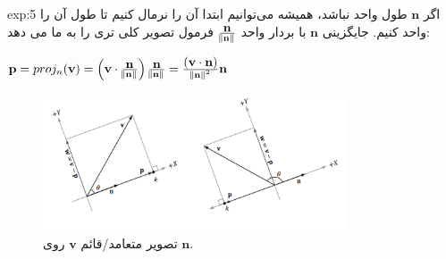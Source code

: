 {\begin{spacing}{1.5}
\begin{example}{exp:5}
            اگر $\textbf{n}$ طول واحد نباشد، همیشه می‌توانیم ابتدا آن را نرمال کنیم تا طول آن را واحد کنیم.
            جایگزینی $\textbf{n}$ با بردار واحد $\frac{\displaystyle\textbf{n}}{\norm{\textbf{n}}}$ فرمول تصویر کلی تری را به ما می دهد:

            \begin{center}
                $\textbf{p}=proj_{n}(\textbf{v})=\left( \textbf{v}\cdot\frac{\displaystyle\textbf{n}}{\norm{\textbf{n}}} \right)\frac{\displaystyle\textbf{n}}{\norm{\textbf{n}}}=\frac{\displaystyle(\textbf{v}\cdot\textbf{n})}{\norm{\textbf{n}}^2}\textbf{n}$
            \end{center}

            \begin{figure}[H]
                \centering
                \setlength{\belowcaptionskip}{-10pt}
                \includegraphics[width=0.8\textwidth]{Images/4/4.Session.1.1.10}
                \caption{تصویر متعامد/قائم $\textbf{v}$ روی $\textbf{n}$. \textbf{\vspace{10pt}}}
                \label{fig:4.Session.1.1.10}
            \end{figure}
        \end{example}
    \end{spacing}
}

\textbf{\vspace{-10pt}}

